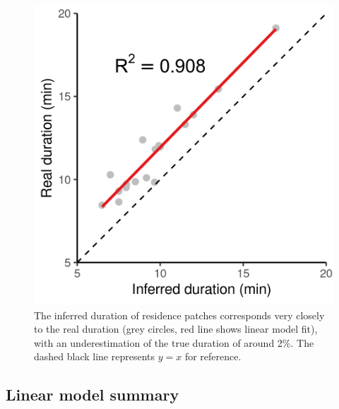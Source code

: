 \documentclass[]{scrreprt}
\begin{document}
\begin{figure}
\centering
\includegraphics{figures/fig_calib_lm_duration.png}
\caption{The inferred duration of residence patches corresponds very closely to the real duration (grey circles, red line shows linear model fit), with an underestimation of the true duration of around 2\%. The dashed black line represents \(y = x\) for reference.}
\end{figure}

\hypertarget{linear-model-summary}{%
\subsection{Linear model summary}\label{linear-model-summary}}
\end{document}
